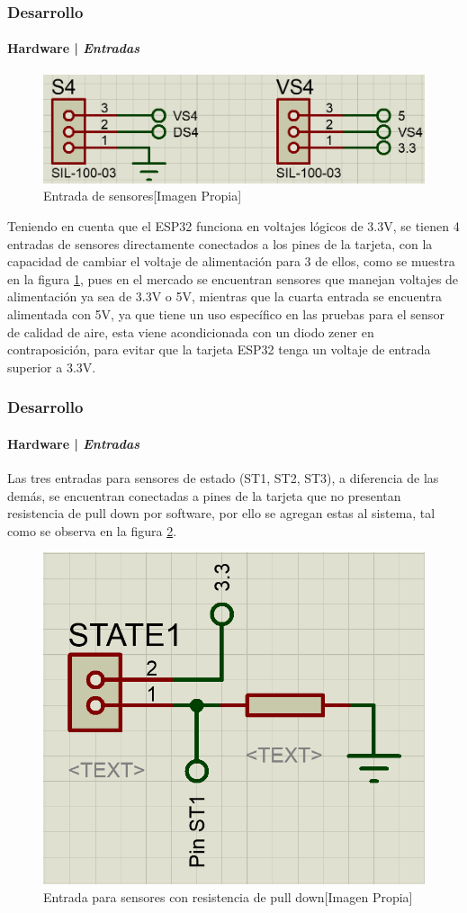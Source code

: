 \begin{frame}
\frametitle{Desarrollo}
\framesubtitle{Hardware | \emph{Entradas}}	

		\begin{figure}
			\centering
			\caption{Entrada de sensores[Imagen Propia]}
			\label{fig:SVS}
			\includegraphics[width=0.7\linewidth]{Imagenes/SVS}
		\end{figure}
		Teniendo en cuenta que el ESP32 funciona en voltajes lógicos de 3.3V, se tienen 4 entradas de sensores directamente conectados a los pines de la tarjeta, con la capacidad de cambiar el voltaje de alimentación para 3 de ellos, como se muestra en la figura \ref{fig:SVS}, pues en el mercado se encuentran sensores que manejan voltajes de alimentación ya sea de 3.3V o 5V, mientras que la cuarta entrada se encuentra alimentada con 5V, ya que tiene un uso específico en las pruebas para el sensor de calidad de aire, esta viene acondicionada con un diodo zener en contraposición, para evitar que la tarjeta ESP32 tenga un voltaje de entrada superior a 3.3V.\\
\end{frame}

\begin{frame}
\frametitle{Desarrollo}
\framesubtitle{Hardware | \emph{Entradas}}

		Las tres entradas para sensores de estado (ST1, ST2, ST3), a diferencia de las demás, se encuentran conectadas a pines de la tarjeta que no presentan resistencia de pull down por software, por ello se agregan estas al sistema, tal como se observa en la figura \ref{fig:ST}.\\
	
		\begin{figure}
			\centering
			\caption{Entrada para sensores con resistencia de pull down[Imagen Propia]}
			\label{fig:ST}
			\includegraphics[width=0.35\linewidth]{Imagenes/ST}
		\end{figure}		

\end{frame}

